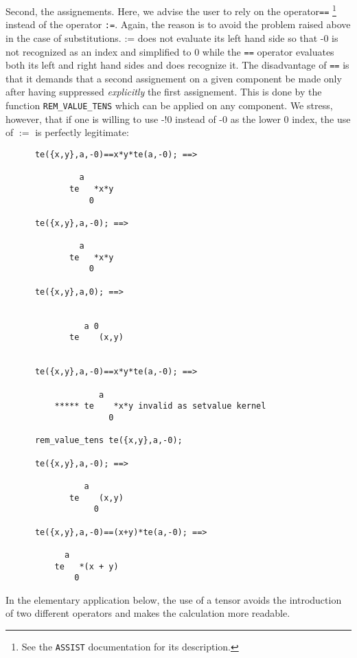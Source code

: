 Second, the assignements. Here, we advise the user to rely on  the 
operator\texttt{==}%
%
\footnote{See the \texttt{ASSIST} documentation for its description.} 
instead of the operator \texttt{:=}. Again, 
the reason is to avoid the problem raised above  in the case of 
substitutions. {:=} does not evaluate its left hand side so that -0 is 
not recognized as an index and simplified to 0 while the \texttt{==} operator
evaluates both 
its left and right hand sides and does recognize it.
The disadvantage of \texttt{==} is that it  demands that a second assignement 
on a given component 
 be made only after having suppressed \emph{explicitly} the first assignement.
This is done by the function \texttt{REM\_VALUE\_TENS} 
which can be applied on any component. We stress, however, that if one 
is willing to use -!0 instead of -0 as the lower 0 index, the use of $:=$
is perfectly legitimate:
\begin{verbatim}
      te({x,y},a,-0)==x*y*te(a,-0); ==>

               a
             te   *x*y
                 0

      te({x,y},a,-0); ==>

               a
             te   *x*y
                 0

      te({x,y},a,0); ==>

  
                a 0
             te    (x,y)


      te({x,y},a,-0)==x*y*te(a,-0); ==>

                   a
          ***** te    *x*y invalid as setvalue kernel
                     0

      rem_value_tens te({x,y},a,-0);

      te({x,y},a,-0); ==>

                a
             te    (x,y)
                  0

      te({x,y},a,-0)==(x+y)*te(a,-0); ==>

            a
          te   *(x + y)
              0
\end{verbatim}
In the elementary application below, the use of a tensor avoids the 
introduction of two different operators and  makes the 
calculation  more readable.  

